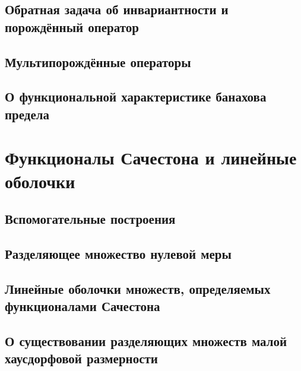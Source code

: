 \documentclass[12pt,a4paper,openbib]{report}
\theoremstyle{definition}
\begin{document}
	\section{Обратная задача об инвариантности и порождённый оператор}
	

	\section{Мультипорождённые операторы}
	

	\section{О функциональной характеристике банахова предела}
	


\chapter{Функционалы Сачестона и линейные оболочки}

	

	\section{Вспомогательные построения}
	

	\section{Разделяющее множество нулевой меры}
	

	\section{Линейные оболочки множеств, определяемых функционалами Сачестона}
	

	\section{О существовании разделяющих множеств малой хаусдорфовой размерности}
	
\end{document}
